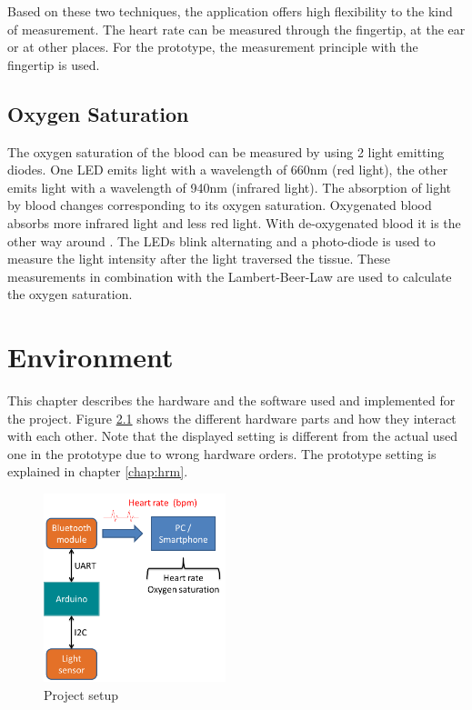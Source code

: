 \documentclass[notitlepage]{scrreprt}
\begin{document}
Based on these two techniques, the application offers high flexibility to the kind of measurement. The heart rate can be measured through the fingertip, at the ear or at other places. For the prototype, the measurement principle with the fingertip is used. 

\section{Oxygen Saturation}
The oxygen saturation of the blood can be measured by using 2 light emitting diodes. One LED emits light with a wavelength of 660nm (red light), the other emits light with a wavelength of 940nm (infrared light). The absorption of light by blood changes corresponding to its oxygen saturation. Oxygenated blood absorbs more infrared light and less red light. With de-oxygenated blood it is the other way around \cite{bib:pulse-oximetry}. The LEDs blink alternating and a photo-diode is used to measure the light intensity after the light traversed the tissue. These measurements in combination with the Lambert-Beer-Law are used to calculate the oxygen saturation.

\chapter{Environment}
\label{chap:environment}
This chapter describes the hardware and the software used and implemented for the project. Figure \ref{fig:data-flow} shows the different hardware parts and how they interact with each other. Note that the displayed setting is different from the actual used one in the prototype due to wrong hardware orders. The prototype setting is explained in chapter \ref{chap:hrm}.

\begin{figure}[H]
	\centering
	\includegraphics[width=200px]{images/general_dataFlow.png}
	\caption{Project setup}
	\label{fig:data-flow}
\end{figure}
\end{document}

